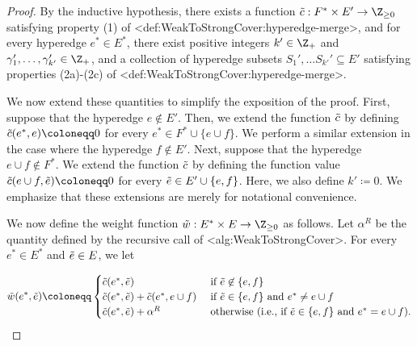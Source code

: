 \documentclass{article}
\def\Cref#1{<#1>}%
\begin{document}
\begin{proof}
    By the inductive hypothesis, there exists a function $\Tilde{c}:F^*\times E' \rightarrow \Z_{\geq 0}$ satisfying property (1) of \Cref{def:WeakToStrongCover:hyperedge-merge}, and for every hyperedge $e^*\in E^*$, there exist positive integers $k' \in \Z_+$ and $\gamma_1', \ldots, \gamma_{k'}' \in \Z_+$, and a collection of hyperedge subsets $S_1', \ldots S_{k'}' \subseteq E'$  satisfying properties (2a)-(2c) of \Cref{def:WeakToStrongCover:hyperedge-merge}.

    We now extend these  quantities to simplify the exposition of the proof. First, suppose that the hyperedge $e \not \in E'$. Then, we extend the function $\Tilde{c}$ by defining $\Tilde{c}(e^*, e) \coloneqq  0$ for every $e^* \in F^* \cup \{e\cup f\}$. We perform a similar extension in the case where the hyperedge $f \not \in E'$. Next, suppose that the hyperedge $e \cup f \not \in F^*$. We extend the function $\Tilde{c}$ by defining the function value $\Tilde{c}(e\cup f, \Tilde{e}) \coloneqq  0$ for every $\Tilde{e} \in E' \cup \{e, f\}$. Here, we also define $k' \coloneqq  0$. We emphasize that these extensions are merely for notational convenience.
   
    We now define the weight function $\Tilde{w}:E^*\times E \rightarrow \Z_{\geq 0}$ as follows. Let $\alpha^R$ be the quantity defined by the recursive call of \Cref{alg:WeakToStrongCover}.
    For every $e^*\in E^*$ and $\Tilde{e} \in E$, we let



$$\Tilde{w}(e^*, \Tilde{e}) \coloneqq  \begin{cases}
        \Tilde{c}(e^*, \Tilde{e})&\text{ if } \Tilde{e} \not\in \{e, f\}\\
        \Tilde{c}(e^*, \Tilde{e}) + \Tilde{c}(e^*, e \cup f)&\text{ if } \Tilde{e} \in \{e, f\} \text{ and } e^* \not = e\cup f\\
        \Tilde{c}(e^*, \Tilde{e}) + \alpha^R& \text{ otherwise (i.e., if $\Tilde{e} \in \{e, f\}$ and $e^* = e \cup f$).}
    \end{cases}$$


\end{proof}
\end{document}
